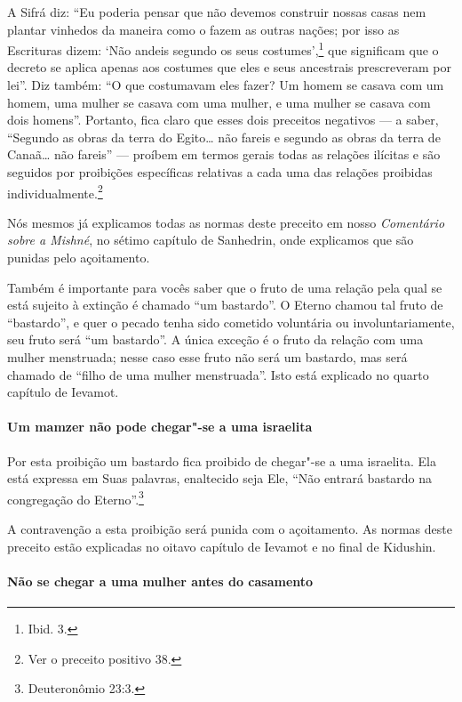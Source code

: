 \begin{multicols}{2}
A Sifrá\starr{} diz: ``Eu poderia pensar que não devemos construir nossas casas
nem plantar vinhedos da maneira como o fazem as outras nações; por isso
as Escrituras dizem: `Não andeis segundo os seus costumes',\footnote{Ibid. 3.}
que significam que o decreto se aplica apenas aos costumes que eles e
seus ancestrais prescreveram por lei''. Diz também: ``O que costumavam
eles fazer? Um homem se casava com um homem, uma mulher se casava com
uma mulher, e uma mulher se casava com dois homens''. Portanto, fica
claro que esses dois preceitos negativos --- a saber, ``Segundo as obras
da terra do Egito\ldots{} não fareis e segundo as obras da terra de Canaã\ldots{} não fareis'' --- proíbem em termos gerais todas as relações ilícitas
e são seguidos por proibições específicas relativas a cada uma das
relações proibidas individualmente.\footnote{Ver o preceito positivo 38.}

Nós mesmos já explicamos todas as normas deste preceito em nosso
\emph{Comentário sobre a Mishné}, no sétimo capítulo de Sanhedrin\starr, onde
explicamos que são punidas pelo açoitamento.

Também é importante para vocês saber que o fruto de uma relação pela
qual se está sujeito à extinção é chamado ``um bastardo''. O Eterno
chamou tal fruto de ``bastardo'', e quer o pecado tenha sido cometido
voluntária ou involuntariamente, seu fruto será ``um bastardo''. A única
exceção é o fruto da relação com uma mulher menstruada; nesse caso esse
fruto não será um bastardo, mas será chamado de ``filho de uma mulher
menstruada''. Isto está explicado no quarto capítulo de Ievamot\starr.

\paragraph{Um mamzer\starr{} não pode chegar"-se a uma israelita}

Por esta proibição um bastardo fica proibido de chegar"-se a uma
israelita. Ela está expressa em Suas palavras, enaltecido seja Ele,
``Não entrará bastardo na congregação do Eterno''.\footnote{Deuteronômio 23:3.}

A contravenção a esta proibição será punida com o açoitamento. As normas
deste preceito estão explicadas no oitavo capítulo de Ievamot\starr{} e no
final de Kidushin\starr.

\paragraph{Não se chegar a uma mulher antes do casamento}


\end{multicols}
